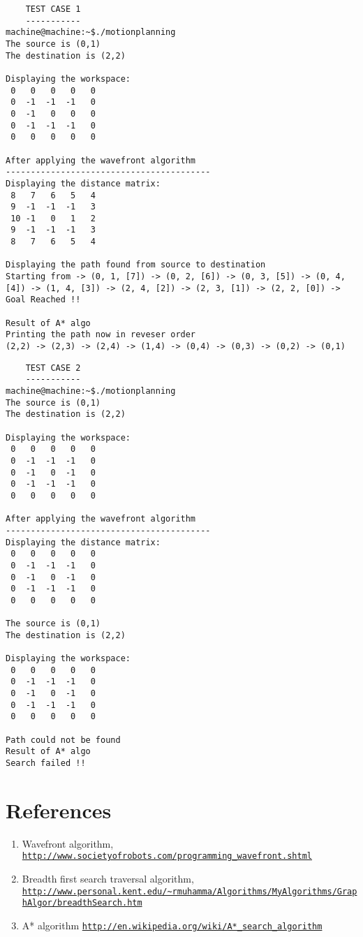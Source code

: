 \documentclass{report}
\begin{document}
		
	\begin{verbatim}	
	TEST CASE 1
	-----------
machine@machine:~$./motionplanning
The source is (0,1) 
The destination is (2,2) 

Displaying the workspace:
 0	 0	 0	 0	 0	
 0	-1	-1	-1	 0	
 0	-1	 0	 0	 0	
 0	-1	-1	-1	 0	
 0	 0	 0	 0	 0	

After applying the wavefront algorithm
-----------------------------------------
Displaying the distance matrix:
 8	 7	 6	 5	 4	
 9	-1	-1	-1	 3	
 10	-1	 0	 1	 2	
 9	-1	-1	-1	 3	
 8	 7	 6	 5	 4	

Displaying the path found from source to destination 
Starting from -> (0, 1, [7]) -> (0, 2, [6]) -> (0, 3, [5]) -> (0, 4, [4]) -> (1, 4, [3]) -> (2, 4, [2]) -> (2, 3, [1]) -> (2, 2, [0]) -> Goal Reached !!

Result of A* algo
Printing the path now in reveser order
(2,2) -> (2,3) -> (2,4) -> (1,4) -> (0,4) -> (0,3) -> (0,2) -> (0,1)	
	\end{verbatim}
	
		
	\begin{verbatim}
	TEST CASE 2
	-----------	
machine@machine:~$./motionplanning
The source is (0,1) 
The destination is (2,2) 

Displaying the workspace:
 0	 0	 0	 0	 0	
 0	-1	-1	-1	 0	
 0	-1	 0	-1	 0	
 0	-1	-1	-1	 0	
 0	 0	 0	 0	 0	

After applying the wavefront algorithm
-----------------------------------------
Displaying the distance matrix:
 0	 0	 0	 0	 0	
 0	-1	-1	-1	 0	
 0	-1	 0	-1	 0	
 0	-1	-1	-1	 0	
 0	 0	 0	 0	 0	

The source is (0,1) 
The destination is (2,2) 

Displaying the workspace:
 0	 0	 0	 0	 0	
 0	-1	-1	-1	 0	
 0	-1	 0	-1	 0	
 0	-1	-1	-1	 0	
 0	 0	 0	 0	 0	

Path could not be found
Result of A* algo
Search failed !!	
	\end{verbatim}
	
	

\section{References}
	\begin{enumerate}
	\item Wavefront algorithm, \href{http://www.societyofrobots.com/programming_wavefront.shtml}{\nolinkurl{http://www.societyofrobots.com/programming_wavefront.shtml}}
	\item Breadth first search traversal algorithm, \href{http://www.personal.kent.edu/~rmuhamma/Algorithms/MyAlgorithms/GraphAlgor/breadthSearch.htm}{\nolinkurl{http://www.personal.kent.edu/~rmuhamma/Algorithms/MyAlgorithms/GraphAlgor/breadthSearch.htm}}
	\item A* algorithm \href{http://en.wikipedia.org/wiki/A*_search_algorithm}{\nolinkurl{http://en.wikipedia.org/wiki/A*_search_algorithm}}
	\end{enumerate}
\end{document}
